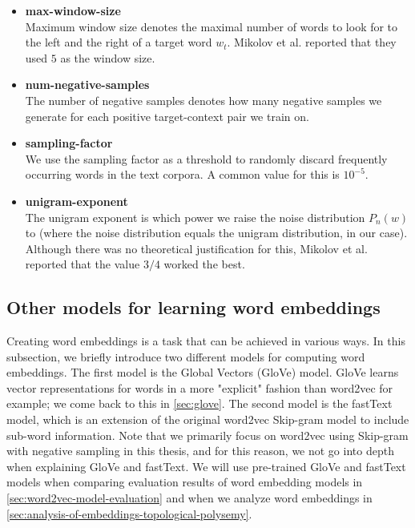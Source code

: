 \begin{itemize}
    \item \textbf{max-window-size} \\
        Maximum window size denotes the maximal number of words to look for to the left and the right of a target word $w_t$. Mikolov et al. reported that they used $5$ as the window size.
    \item \textbf{num-negative-samples} \\
        The number of negative samples denotes how many negative samples we generate for each positive target-context pair we train on.
    \item \textbf{sampling-factor} \\
        We use the sampling factor as a threshold to randomly discard frequently occurring words in the text corpora. A common value for this is $10^{-5}$.
    \item \textbf{unigram-exponent} \\
        The unigram exponent is which power we raise the noise distribution $P_n(w)$ to (where the noise distribution equals the unigram distribution, in our case). Although there was no theoretical justification for this, Mikolov et al. reported that the value $3/4$ worked the best.
\end{itemize}

\subsection{Other models for learning word embeddings}
\label{sec:other-models-for-learning-word-embeddings}
Creating word embeddings is a task that can be achieved in various ways. In this subsection, we briefly introduce two different models for computing word embeddings. The first model is the Global Vectors (GloVe) \cite{pennington2014glove} model. GloVe learns vector representations for words in a more "explicit" fashion than word2vec for example; we come back to this in \cref{sec:glove}. The second model is the fastText \cite{bojanowski2017enriching} model, which is an extension of the original word2vec Skip-gram model to include sub-word information. Note that we primarily focus on word2vec using Skip-gram with negative sampling in this thesis, and for this reason, we not go into depth when explaining GloVe and fastText. We will use pre-trained GloVe and fastText models when comparing evaluation results of word embedding models in \cref{sec:word2vec-model-evaluation} and when we analyze word embeddings in \cref{sec:analysis-of-embeddings-topological-polysemy}.

